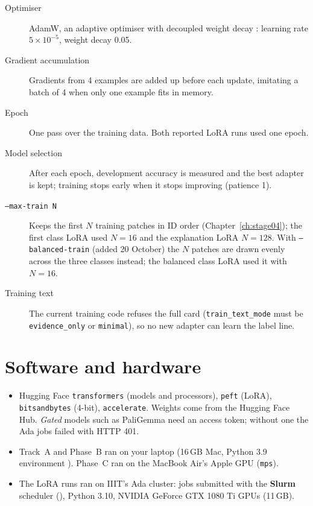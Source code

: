 \begin{description}
  \item[Optimiser] AdamW, an adaptive optimiser with decoupled weight decay \citep{loshchilov2019}: learning rate $5\times10^{-5}$, weight decay 0.05.
  \item[Gradient accumulation] Gradients from 4 examples are added up before each update, imitating a batch of 4 when only one example fits in memory.
  \item[Epoch] One pass over the training data. Both reported LoRA runs used one epoch.
  \item[Model selection] After each epoch, development accuracy is measured and the best adapter is kept; training stops early when it stops improving (patience 1).
  \item[\texttt{--max-train N}] Keeps the first $N$ training patches in ID order (Chapter~\ref{ch:stage04}); the first class LoRA used $N = 16$ and the explanation LoRA $N = 128$. With \texttt{--balanced-train} (added 20 October) the $N$ patches are drawn evenly across the three classes instead; the balanced class LoRA used it with $N = 16$.
  \item[Training text] The current training code refuses the full card (\texttt{train\_text\_mode} must be \texttt{evidence\_only} or \texttt{minimal}), so no new adapter can learn the label line.
\end{description}

\section{Software and hardware}

\begin{itemize}
  \item Hugging Face \texttt{transformers} (models and processors), \texttt{peft} (LoRA), \texttt{bitsandbytes} (4-bit), \texttt{accelerate}. Weights come from the Hugging Face Hub. \emph{Gated} models such as PaliGemma need an access token; without one the Ada jobs failed with HTTP 401.
  \item Track~A and Phase~B ran on your laptop (16\,GB Mac, Python 3.9 environment ). Phase~C ran on the MacBook Air's Apple GPU (\texttt{mps}).
  \item The LoRA runs ran on IIIT's Ada cluster: jobs submitted with the \textbf{Slurm} scheduler (), Python 3.10, NVIDIA GeForce GTX 1080 Ti GPUs (11\,GB).
\end{itemize}

